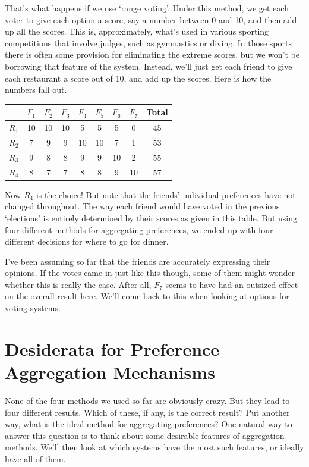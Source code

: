 \documentclass[openany]{book}
\begin{document}
That's what happens if we use `range voting'. Under this method, we get each voter to give each option a score, say a number between 0 and 10, and then add up all the scores. This is, approximately, what's used in various sporting competitions that involve judges, such as gymnastics or diving. In those sports there is often some provision for eliminating the extreme scores, but we won't be borrowing that feature of the system. Instead, we'll just get each friend to give each restaurant a score out of 10, and add up the scores. Here is how the numbers fall out.

\begin{center}
\begin{tabular}{r | c c c c c c c c}
 & $F_1$ & $F_2$ & $F_3$ & $F_4$ & $F_5$ & $F_6$ & $F_7$ & Total \\ \hline
$R_1$ & 10 & 10 & 10 & 5 & 5 & 5 & 0 & 45 \\
$R_2$ & 7 & 9 & 9 & 10 & 10 & 7 & 1 & 53\\
$R_3$ & 9 & 8 & 8 & 9 & 9 & 10 & 2 & 55 \\
$R_4$ &8 & 7 & 7 & 8 & 8 & 9 & 10 & 57
\end{tabular}
\end{center}Now $R_4$ is the choice! But note that the friends' individual preferences have not changed throughout. The way each friend would have voted in the previous `elections' is entirely determined by their scores as given in this table. But using four different methods for aggregating preferences, we ended up with four different decisions for where to go for dinner.

I've been assuming so far that the friends are accurately expressing their opinions. If the votes came in just like this though, some of them might wonder whether this is really the case. After all, $F_7$ seems to have had an outsized effect on the overall result here. We'll come back to this when looking at options for voting systems.

\section{Desiderata for Preference Aggregation Mechanisms}
None of the four methods we used so far are obviously crazy. But they lead to four different results. Which of these, if any, is the correct result? Put another way, what is the ideal method for aggregating preferences? One natural way to answer this question is to think about some desirable features of aggregation methods. We'll then look at which systems have the most such features, or ideally have all of them.
\end{document}
